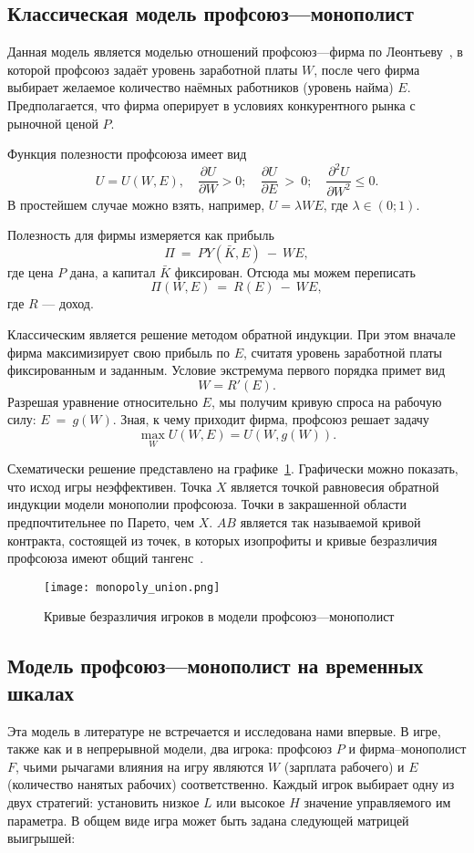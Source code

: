 \subsection{Классическая модель профсоюз---монополист}
\label{sec:monopoly}

Данная модель является моделью отношений профсоюз---фирма по
Леонтьеву~\cite{LeontiefW}, в которой профсоюз задаёт уровень заработной платы $W$,
после чего фирма выбирает желаемое количество наёмных работников (уровень
найма) $E$. Предполагается, что фирма оперирует в условиях конкурентного рынка с
рыночной ценой $P$.

Функция полезности профсоюза имеет вид 
$$ 
	U = U(W,E), 
	\quad 
		\frac{\partial U}{\partial W} > 0; 
	\quad 
		\frac{\partial U}{\partial E}~>~0;
	\quad   
		\frac{\partial^2 U}{\partial W^2} \leqslant 0.
$$ 
В простейшем случае можно взять, например, $U = \lambda WE$, где $\lambda \in (0; 1)$.

Полезность для фирмы измеряется как прибыль 
$$
	\Pi~=~PY(\bar K,E)~-~WE,
$$ 
где цена $P$ дана, а капитал $\bar K$ фиксирован. Отсюда мы можем переписать 
$$
	\Pi(W,E)~=~R(E)~-~WE,
$$ 
где $R$ --- доход.

Классическим является решение методом обратной индукции.
При этом вначале фирма максимизирует свою прибыль по $E$, считатя уровень
заработной платы фиксированным и заданным. Условие экстремума первого порядка примет вид 
$$ 
	W = R'(E).
$$
Разрешая уравнение относительно $E$, мы получим кривую спроса на рабочую силу: $E~=~g(W)$.
Зная, к чему приходит фирма, профсоюз решает задачу
$$ 
	\max_W U(W,E) = U(W, g(W)).
$$

Схематически решение представлено на графике~\ref{fig:monopoly_union}.
Графически можно показать, что исход игры неэффективен. Точка $X$ является
точкой равновесия обратной индукции модели монополии профсоюза. Точки в
закрашенной области предпочтительнее по Парето, чем $X$. $AB$ является так называемой 
кривой контракта, состоящей из точек, в которых изопрофиты и кривые безразличия
профсоюза имеют общий тангенс~\cite{ShandongUniver}.


\begin{figure}[h]
	\centering
	\texttt{[image: monopoly\_union.png]}
	\caption{Кривые безразличия игроков в модели профсоюз---монополист}
	\label{fig:monopoly_union}
\end{figure}

\subsection{Модель профсоюз---монополист на временных шкалах}
Эта модель в литературе не встречается и исследована нами впервые.  
В игре, также как и в непрерывной модели, два игрока: профсоюз $P$ и фирма--монополист
$F$, чьими рычагами влияния на игру являются $W$ (зарплата рабочего) и $E$ 
(количество нанятых рабочих) соответственно.  Каждый игрок выбирает одну из двух
стратегий: установить низкое $L$ или высокое $H$ значение управляемого им параметра. 
В общем виде игра может быть задана следующей матрицей выигрышей: 


